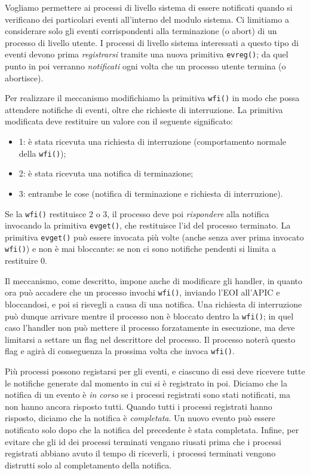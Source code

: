 Vogliamo permettere ai processi di livello sistema di essere notificati quando si verificano
dei particolari eventi all'interno del modulo sistema. Ci limitiamo a considerare solo gli
eventi corrispondenti alla terminazione (o abort) di un processo di livello utente.
I processi di livello sistema interessati a questo tipo di eventi devono prima {\em registrarsi}
tramite una nuova primitiva \verb|evreg()|;
da quel punto in poi verranno {\em notificati} ogni volta che un
processo utente termina (o abortisce).

Per realizzare il meccanismo modifichiamo la primitiva \verb|wfi()| in modo che possa attendere
notifiche di eventi, oltre che richieste di interruzione. La primitiva modificata deve restituire
un valore con il seguente significato:
\begin{itemize}
 \item 1: \`e stata ricevuta una richiesta di interruzione (comportamento normale della \verb|wfi()|);
 \item 2: \`e stata ricevuta una notifica di terminazione;
 \item 3: entrambe le cose (notifica di terminazione e richiesta di interruzione).
\end{itemize}
Se la \verb|wfi()| restituisce 2 o 3, il processo deve poi {\em rispondere} alla notifica invocando
la primitiva \verb|evget()|, che restituisce l'id del processo terminato. La primitiva \verb|evget()|
pu\`o essere invocata pi\`u volte (anche senza aver prima invocato \verb|wfi()|) e non \`e mai
bloccante: se non ci sono notifiche pendenti si limita a restituire 0.

Il meccanismo, come descritto, impone anche di modificare gli handler, in quanto ora pu\`o accadere
che un processo invochi \verb|wfi()|, inviando l'EOI all'APIC e bloccandosi, e poi si risvegli a causa
di una notifica. Una richiesta di interruzione pu\`o dunque arrivare mentre il processo non \`e
bloccato dentro la \verb|wfi()|; in quel caso l'handler non pu\`o mettere il processo forzatamente in
esecuzione, ma deve limitarsi a settare un flag nel descrittore del processo. Il processo noter\`a
questo flag e agir\`a di conseguenza la prossima volta che invoca \verb|wfi()|.

Pi\`u processi possono registarsi per gli eventi, e ciascuno di essi deve ricevere tutte le notifiche
generate dal momento in cui si \`e registrato in poi. Diciamo che la notifica di un evento \`e {\em in corso} se i
processi registrati sono stati notificati, ma non hanno ancora risposto tutti. 
Quando tutti i processi registrati hanno risposto, diciamo che la notifica \`e {\em completata}.
Un nuovo evento pu\`o essere notificato solo dopo che la notifica del precedente \`e stata completata.
Infine, per evitare che gli id dei processi terminati vengano riusati prima che i processi registrati
abbiano avuto il tempo di riceverli, i processi terminati vengono distrutti solo al completamento
della notifica.


